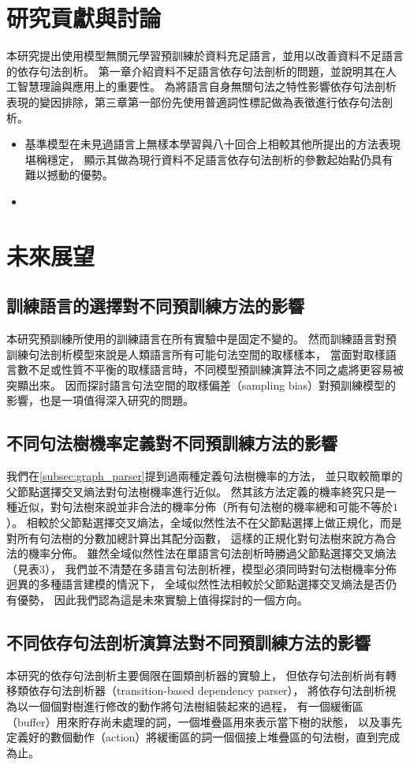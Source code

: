 \section{研究貢獻與討論}
本研究提出使用模型無關元學習預訓練於資料充足語言，並用以改善資料不足語言的依存句法剖析。
第一章介紹資料不足語言依存句法剖析的問題，並說明其在人工智慧理論與應用上的重要性。
為將語言自身無關句法之特性影響依存句法剖析表現的變因排除，第三章第一部份先使用普適詞性標記做為表徵進行依存句法剖析。
\begin{itemize}
    \item 基準模型在未見過語言上無樣本學習與八十回合上相較其他所提出的方法表現堪稱穩定，
顯示其做為現行資料不足語言依存句法剖析的參數起始點仍具有難以撼動的優勢。
    \item 
\end{itemize}
\section{未來展望}
\subsection{訓練語言的選擇對不同預訓練方法的影響}
本研究預訓練所使用的訓練語言在所有實驗中是固定不變的。
然而訓練語言對預訓練句法剖析模型來說是人類語言所有可能句法空間的取樣樣本，
當面對取樣語言數不足或性質不平衡的取樣語言時，不同模型預訓練演算法不同之處將更容易被突顯出來。
因而探討語言句法空間的取樣偏差（sampling bias）對預訓練模型的影響，也是一項值得深入研究的問題。
\subsection{不同句法樹機率定義對不同預訓練方法的影響}
我們在\ref{subsec:graph_parser}提到過兩種定義句法樹機率的方法，
並只取較簡單的父節點選擇交叉熵法對句法樹機率進行近似。
然其該方法定義的機率終究只是一種近似，對句法樹來說並非合法的機率分佈（所有句法樹的機率總和可能不等於$1$）。
相較於父節點選擇交叉熵法，全域似然性法不在父節點選擇上做正規化，而是對所有句法樹的分數加總計算出其配分函數，
這樣的正規化對句法樹來說方為合法的機率分佈。
雖然全域似然性法在單語言句法剖析時勝過父節點選擇交叉熵法（見\cite{ma-hovy-2017-neural}表3），
我們並不清楚在多語言句法剖析裡，模型必須同時對句法樹機率分佈迥異的多種語言建模的情況下，
全域似然性法相較於父節點選擇交叉熵法是否仍有優勢，
因此我們認為這是未來實驗上值得探討的一個方向。

\subsection{不同依存句法剖析演算法對不同預訓練方法的影響}
本研究的依存句法剖析主要侷限在圖類剖析器的實驗上，
但依存句法剖析尚有轉移類依存句法剖析器（transition-based dependency parser），
將依存句法剖析視為以一個個對樹進行修改的動作將句法樹組裝起來的過程，
有一個緩衝區（buffer）用來貯存尚未處理的詞，一個堆疊區用來表示當下樹的狀態，
以及事先定義好的數個動作（action）將緩衝區的詞一個個接上堆疊區的句法樹，直到完成為止。

